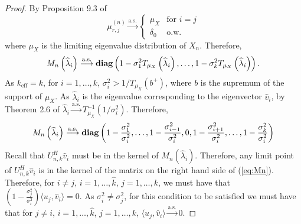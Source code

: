 \begin{proof}
By Proposition 9.3 of \cite{benaych2011eigenvalues}
\begin{equation*}
\mu_{r,j}^{\left(n\right)}\overset{\text{a.s.}}{\longrightarrow}\begin{cases}\mu_X & \text{for } i=j \\ \delta_0 & \text{o.w.} \end{cases}
\end{equation*}
where $\mu_X$ is the limiting eigenvalue distribution of $X_n$. Therefore,
\begin{equation*}
M_n\left(\widehat{\lambda}_i\right)\overset{\text{a.s.}}{\longrightarrow}\mathop{\bf diag}\left(1-\sigma_1^2T_{\mu_X}\left(\widehat{\lambda}_i\right), \dots, 1-\sigma_k^2T_{\mu_X}\left(\widehat{\lambda}_i\right)\right).
\end{equation*}
As $k_\text{eff}=k$, for $i=1,\dots,k$, $\sigma_i^2>1/T_{\mu_X}(b^+)$, where $b$ is the supremum of the support of $\mu_X$. As $\widehat{\lambda}_i$ is the eigenvalue corresponding to the eigenvector $\widehat{v}_i$, by Theorem 2.6 of \cite{benaych2011eigenvalues} $\widehat{\lambda}_i\overset{\text{a.s.}}{\longrightarrow}T^{-1}_{\mu_X}\left(1/\sigma_i^2\right)$. Therefore,
\footnotesize\begin{equation}\label{eq:Mn}
M_n\left(\widehat{\lambda}_i\right)\overset{\text{a.s.}}{\longrightarrow}\diag\left(1-\frac{\sigma_1^2}{\sigma_i^2}, \dots, 1-\frac{\sigma_{i-1}^2}{\sigma_i^2}, 0, 1-\frac{\sigma_{i+1}^2}{\sigma_i^2}, \dots, 1-\frac{\sigma_k^2}{\sigma_i^2}\right)
\end{equation}\normalsize
Recall that $U_{n,k}^H\widehat{v}_i$ must be in the kernel of $M_n\left(\widehat{\lambda}_i\right)$. Therefore, any limit point of $U_{n,k}^H\widehat{v}_i$ is in the kernel of the matrix on the right hand side of (\ref{eq:Mn}). Therefore, for $i\neq j$, $i=1,\dots,\widehat{k}$, $j=1,\dots,k$, we must have that $\left(1-\frac{\sigma_j^2}{\sigma_i^2}\right)\langle u_j,\widehat{v}_i\rangle=0$. As $\sigma_i^2\neq\sigma_j^2$, for this condition to be satisfied we must have that for $j\neq i$, $i=1,\dots,\widehat{k}$, $j=1,\dots,k$, $\langle u_j,\widehat{v}_i\rangle\overset{\text{a.s.}}{\longrightarrow}0$.


\end{proof}
